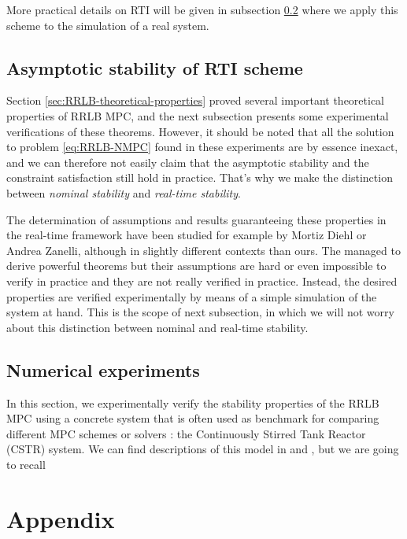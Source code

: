 \documentclass[12pt]{article}
\begin{document}
More practical details on RTI will be given in subsection \ref{sec:RRLB-numerical-experiments} where we apply this scheme to the simulation of a real system.

\subsection{Asymptotic stability of RTI scheme}\label{sec:RRLB-real-time-stability}

Section \ref{sec:RRLB-theoretical-properties} proved several important theoretical properties of RRLB MPC, and the next subsection presents some experimental verifications of these theorems.
However, it should be noted that all the solution to problem \ref{eq:RRLB-NMPC} found in these experiments are by essence inexact, and we can therefore not easily claim that the asymptotic stability and the constraint satisfaction still hold in practice. That's why we make the distinction between \textit{nominal stability} and \textit{real-time stability}.

The determination of assumptions and results guaranteeing these properties in the real-time framework have been studied for example by Mortiz Diehl or Andrea Zanelli, although in slightly different contexts than ours.
The managed to derive powerful theorems but their assumptions are hard or even impossible to verify in practice and they are not really verified in practice.
Instead, the desired properties are verified experimentally by means of a simple simulation of the system at hand.
This is the scope of next subsection, in which we will not worry about this distinction between nominal and real-time stability.


\subsection{Numerical experiments}\label{sec:RRLB-numerical-experiments}

In this section, we experimentally verify the stability properties of the RRLB MPC using a concrete system that is often used as benchmark for comparing different MPC schemes or solvers : the Continuously Stirred Tank Reactor (CSTR) system.
We can find descriptions of this model in \cite{diehl-dissertation} and \cite{cstr-ref}, but we are going to recall

\newpage

\section{Appendix}
\printbibliography
\end{document}
